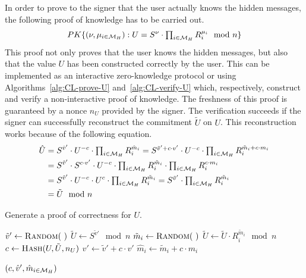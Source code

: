 In order to prove to the signer that the user actually knows the hidden
messages, the following proof of knowledge has to be carried out.
\begin{equation*}
  PK\{(\nu, \mu_{i \in \mathcal{M}_H}) :
    U = S^{\nu} \cdot \textstyle\prod_{i \in \mathcal{M}_H} R_i^{\mu_i} \mod n\}
\end{equation*}
This proof not only proves that the user knows the hidden messages, but also
that the value $U$ has been constructed correctly by the user. This can be
implemented as an interactive zero-knowledge protocol or using
Algorithms~\ref{alg:CL-prove-U} and~\ref{alg:CL-verify-U} which, respectively,
construct and verify a non-interactive proof of knowledge. The freshness of this
proof is guaranteed by a nonce $n_U$ provided by the signer. The verification
succeeds if the signer can successfully reconstruct the commitment $\tilde{U}$
on $U$. This reconstruction works because of the following equation.
\begin{align*}
  \hat{U}
  & = S^{\hat{v}'} \cdot U^{-c} \cdot
    \textstyle \prod_{i \in \mathcal{M}_H} R_i^{\hat{m}_i}
    = S^{\tilde{v}' + c \cdot v'} \cdot U^{-c} \cdot
    \textstyle\prod_{i \in \mathcal{M}_H} R_i^{\tilde{m}_i + c \cdot m_i} \\
  & = S^{\tilde{v}'} \cdot S^{c \cdot v'} \cdot U^{-c}
    \cdot \textstyle\prod_{i \in \mathcal{M}_H} R_i^{\tilde{m}_i}
    \cdot \textstyle\prod_{i \in \mathcal{M}_H} R_i^{c \cdot m_i} \\
  & = S^{\tilde{v}'} \cdot U^{-c} \cdot U^c
    \cdot \textstyle\prod_{i \in \mathcal{M}_H} R_i^{\tilde{m}_i}
    = S^{\tilde{v}'} \cdot \textstyle\prod_{i \in \mathcal{M}_H} R_i^{\tilde{m}_i} \\
  & = \tilde{U} \mod n
\end{align*}

\begin{algorithm}[t]
  \caption{Generate a proof of correctness for $U$.}
  \label{alg:CL-prove-U}
  \addtolength{\baselineskip}{1mm}
  \begin{algorithmic}[1]
      \State $\tilde{v}' \gets \Call{Random}{~}$
      \State $\tilde{U} \gets S^{\tilde{v}'} \mod n$
        \State $\tilde{m}_i \gets \Call{Random}{~}$
        \State $\tilde{U} \gets \tilde{U} \cdot R_i^{\tilde{m}_i} \mod n$
      \EndFor
      \State $c \gets \Call{Hash}{U, \tilde{U}, n_U}$
      \State $\hat{v}' \gets \tilde{v}' + c \cdot v'$
        \State $\hat{m}_i \gets \tilde{m}_i + c \cdot m_i$
      \EndFor

      \Return $(c, \hat{v}', \hat{m}_{i \in \mathcal{M}_H})$
    \EndFunction
  \end{algorithmic}
\end{algorithm}

